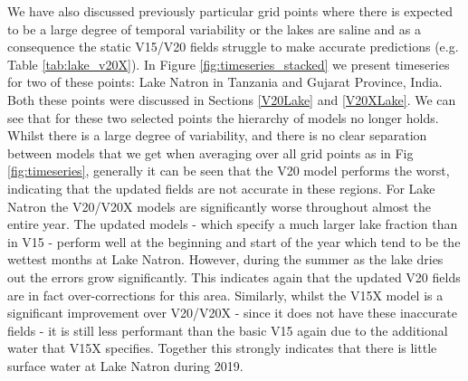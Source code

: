 \documentclass[twocolumn]{article}
\begin{document}
	
	\noindent We have also discussed previously particular grid points where there is expected to be a large degree of temporal variability or the lakes are saline and as a consequence the static V15/V20 fields struggle to make accurate predictions (e.g. Table \ref{tab:lake_v20X}). In Figure \ref{fig:timeseries_stacked} we present timeseries for two of these points: Lake Natron in Tanzania and Gujarat Province, India. Both these points were discussed in Sections \ref{V20Lake} and \ref{V20XLake}. We can see that for these two selected points the hierarchy of models no longer holds. Whilst there is a large degree of variability, and there is no clear separation between models that we get when averaging over all grid points as in Fig \ref{fig:timeseries}, generally it can be seen that the V20 model performs the worst, indicating that the updated fields are not accurate in these regions. For Lake Natron the V20/V20X models are significantly worse throughout almost the entire year. The updated models - which specify a much larger lake fraction than in V15 - perform well at the beginning and start of the year which tend to be the wettest months at Lake Natron. However,  during the summer as the lake dries out the errors grow significantly. This indicates again that the updated V20 fields are in fact over-corrections for this area. Similarly, whilst the V15X model is a significant improvement over V20/V20X - since it does not have these inaccurate fields -  it is still less performant than the basic V15 again due to the additional water that V15X specifies. Together this strongly indicates that there is little surface water at Lake Natron during 2019. \newline 
	
\end{document}
